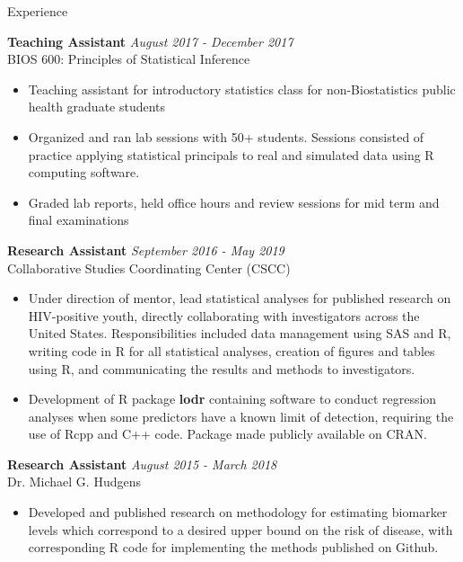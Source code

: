 \documentclass{resume} %
\begin{document}
\begin{rSection}{Experience}
\begin{itemize}
\end{itemize}
{\bf Teaching Assistant} \hfill {\em August 2017 - December 2017} 
\\ BIOS 600: Principles of Statistical Inference
\begin{itemize}
    \item Teaching assistant for introductory statistics class for non-Biostatistics public health graduate students
    \item Organized and ran lab sessions with 50+ students.  Sessions consisted of practice applying statistical principals to real and simulated data using R computing software.
    \item Graded lab reports, held office hours and review sessions for mid term and final examinations
\end{itemize}
{\bf Research Assistant} \hfill {\em September 2016 - May 2019} 
\\ Collaborative Studies Coordinating Center (CSCC)
\begin{itemize}
    \item Under direction of mentor, lead statistical analyses for published research on HIV-positive youth, directly collaborating with investigators across the United States.  Responsibilities included data management using SAS and R, writing code in R for all statistical analyses, creation of figures and tables using R, and communicating the results and methods to investigators.
    \item Development of R package \textbf{lodr} containing software to conduct regression analyses when some predictors have a known limit of detection, requiring the use of Rcpp and C++ code.  Package made publicly available on CRAN.
\end{itemize}
{\bf Research Assistant} \hfill {\em August 2015 - March 2018} 
\\ Dr. Michael G. Hudgens
\begin{itemize}
    \item Developed and published research on methodology for estimating biomarker levels which correspond to a desired upper bound on the risk of disease, with corresponding R code for implementing the methods published on Github.
\end{itemize}

\end{rSection}
\end{document}
